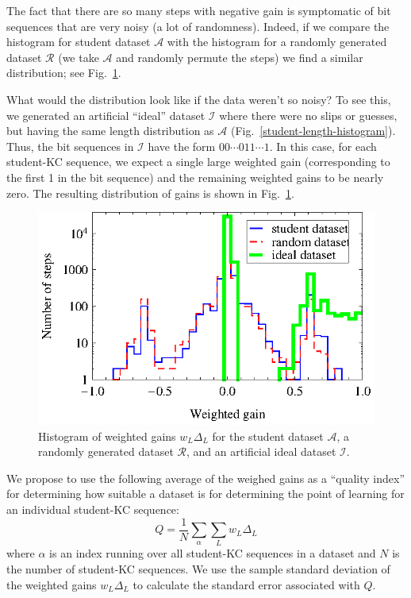 \documentclass{acmlarge-edm}
\begin{document}
The fact that there are so many steps with negative gain is
symptomatic of bit sequences that are very noisy (a lot of
randomness).  Indeed, if we compare the histogram for student
dataset $\mathcal{A}$ with the histogram for a randomly 
generated dataset $\mathcal{R}$ (we take $\mathcal{A}$ and
randomly permute the steps) we find a similar distribution;
see Fig.~\ref{weighted-gain-histogram2}.

What would the distribution look like if the data weren't 
so noisy?  To see this, we generated an artificial ``ideal'' dataset
$\mathcal{I}$ where there were no slips or guesses, but having
the same length distribution as $\mathcal{A}$ 
(Fig.~\ref{student-length-histogram}).  Thus, the bit sequences
in $\mathcal{I}$ have the form $00\cdots011\cdots1$.
In this case, for each student-KC sequence, we expect a single 
large weighted gain (corresponding to the first 1 in the bit sequence) 
and the remaining weighted gains to be nearly zero.  The resulting 
distribution of gains is shown
in  Fig.~\ref{weighted-gain-histogram2}.

\begin{figure}
  \centering \includegraphics{weighted-gain-histogram2.eps}
   \caption{Histogram of weighted gains $w_L \Delta_L$ for
     the student dataset $\mathcal{A}$, 
     a randomly generated dataset $\mathcal{R}$,
     and an artificial ideal dataset $\mathcal{I}$.}
    \label{weighted-gain-histogram2}
\end{figure}


We propose to use the following average of the weighed gains as
a ``quality index'' for determining how suitable a 
dataset is for determining the point of learning for an individual
student-KC sequence:
%
\begin{equation}
           Q= \frac{1}{N} \sum_\alpha \sum_L w_L \Delta_L
\end{equation}
%
where $\alpha$ is an index running over all student-KC sequences in a 
dataset and $N$ is the number of student-KC sequences.
We use the sample standard deviation of the weighted gains $w_L \Delta_L$
to calculate the standard error associated with $Q$. 
\end{document}
